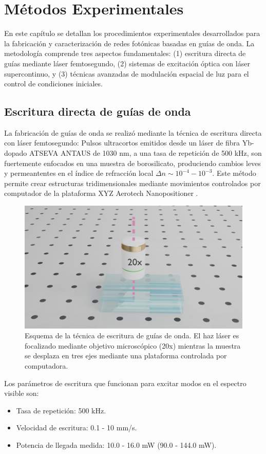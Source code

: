 \chapter{Métodos Experimentales}

En este capítulo se detallan los procedimientos experimentales desarrollados para la fabricación y caracterización de redes fotónicas basadas en guías de onda. La metodología comprende tres aspectos fundamentales: (1) escritura directa de guías mediante láser femtosegundo, (2) sistemas de excitación óptica con láser supercontinuo, y (3) técnicas avanzadas de modulación espacial de luz para el control de condiciones iniciales.


\section{Escritura directa de guías de onda \label{cap:fs}}

La fabricación de guías de onda se realizó mediante la técnica de escritura directa con láser femtosegundo: Pulsos ultracortos emitidos desde un láser de fibra Yb-dopado ATSEVA ANTAUS de 1030 nm, a una tasa de repetición de 500 kHz, son fuertemente enfocados en una muestra de borosilicato, produciendo cambios leves y permeantentes en el índice de refracción local $\Delta n \sim 10^{-4}-10^{-3}$. Este método permite crear estructuras tridimensionales mediante movimientos controlados por computador de la plataforma XYZ Aerotech Nanopositioner \citep{femto_writing}.

\begin{figure}[H]
    \centering
    \includegraphics[width=0.6\linewidth, trim={18cm 4cm 15cm 6cm},clip]{media/fabrication1}
    \caption[Esquema de la técnica de escritura de guías de onda.]{Esquema de la técnica de escritura de guías de onda. El haz láser es focalizado mediante objetivo microscópico (20x) mientras la muestra se desplaza en tres ejes mediante una plataforma controlada por computadora.}
\end{figure}

Los parámetros de escritura que funcionan para excitar modos en el espectro visible son:
\begin{itemize}
    \item Tasa de repetición: 500 kHz.
    \item Velocidad de escritura: 0.1 - 10 mm/s.
    \item Potencia de llegada medida: 10.0 - 16.0 mW (90.0 - 144.0 mW).
\end{itemize}

